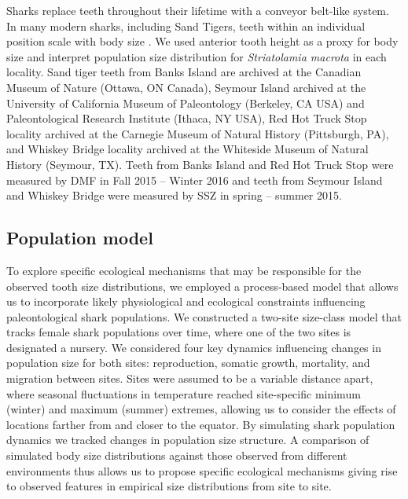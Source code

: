\documentclass[]{rsos}%
\begin{document}
Sharks replace teeth throughout their lifetime with a conveyor belt-like system. 
In many modern sharks, including Sand Tigers, teeth within an individual position scale with body size \cite{Shimada2002, Shimada2004, Shimada2007, Shimada2020}. 
We used anterior tooth height as a proxy for body size and interpret population size distribution for \emph{Striatolamia macrota} in each locality. 
Sand tiger teeth from Banks Island are archived at the Canadian Museum of Nature (Ottawa, ON Canada), Seymour Island archived at the University of California Museum of Paleontology (Berkeley, CA USA) and Paleontological Research Institute (Ithaca, NY USA), Red Hot Truck Stop locality archived at the Carnegie Museum of Natural History (Pittsburgh, PA), and Whiskey Bridge locality archived at the Whiteside Museum of Natural History (Seymour, TX). 
Teeth from Banks Island and Red Hot Truck Stop were measured by DMF in Fall 2015 – Winter 2016 and teeth from Seymour Island and Whiskey Bridge were measured by SSZ in spring – summer 2015. 




\subsection{Population model}

To explore specific ecological mechanisms that may be responsible for the observed tooth size distributions, we employed a process-based model that allows us to incorporate likely physiological and ecological constraints influencing paleontological shark populations.
We constructed a two-site size-class model that tracks female shark populations over time, where one of the two sites is designated a nursery.
We considered four key dynamics influencing changes in population size for both sites: reproduction, somatic growth, mortality, and migration between sites.
Sites were assumed to be a variable distance apart, where seasonal fluctuations in temperature reached site-specific minimum (winter) and maximum (summer) extremes, allowing us to consider the effects of locations farther from and closer to the equator.
By simulating shark population dynamics we tracked changes in population size structure. 
A comparison of simulated body size distributions against those observed from different environments thus allows us to propose specific ecological mechanisms giving rise to observed features in empirical size distributions from site to site.
\end{document}
